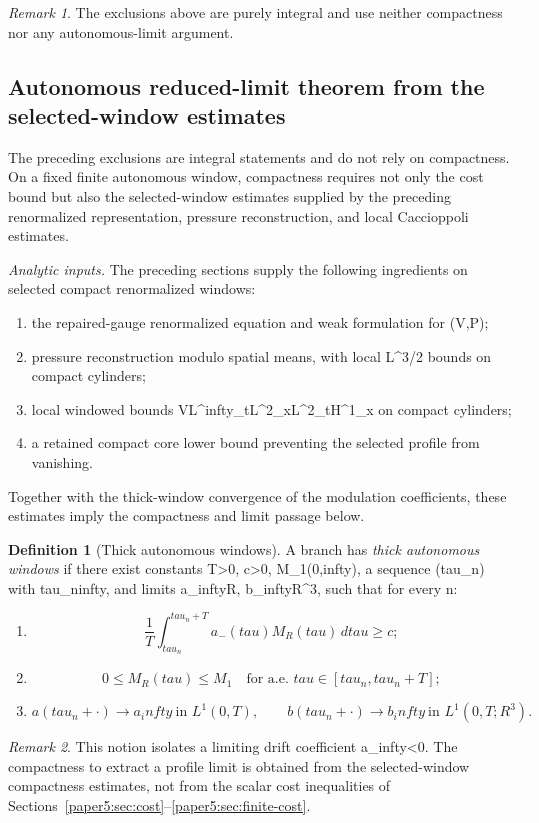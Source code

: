 \documentclass[11pt]{amsart}
\def\({}%
\def\){}%
\def\mathbb#1{#1}%
\def\tau{tau}%
\def\infty{infty}%
\theoremstyle{plain}
\theoremstyle{definition}
\newtheorem{definition}[definition]{Definition}
\theoremstyle{remark}
\newtheorem{remark}[remark]{Remark}
\begin{document}
\begin{remark}
The exclusions above are purely integral and use neither compactness nor any
autonomous-limit argument.
\end{remark}

\subsection{Autonomous reduced-limit theorem from the selected-window estimates}
\label{paper5:sec:autonomous}

The preceding exclusions are integral statements and do not rely on compactness.  On a fixed finite autonomous window, compactness requires not only the cost bound but also the selected-window estimates supplied by the preceding renormalized representation, pressure reconstruction, and local Caccioppoli estimates.

\medskip
\noindent\textit{Analytic inputs.}
The preceding sections supply the following ingredients on selected compact
renormalized windows:
\begin{enumerate}[label=(\arabic*)]
  \item the repaired-gauge renormalized equation and weak formulation for \((V,P)\);
  \item pressure reconstruction modulo spatial means, with local \(L^{3/2}\) bounds on compact
    cylinders;
  \item local windowed bounds
  \(V\in L^\infty_tL^2_x\cap L^2_tH^1_x\) on compact cylinders;
  \item a retained compact core lower bound preventing the selected profile from vanishing.
\end{enumerate}
Together with the thick-window convergence of the modulation coefficients, these estimates imply
the compactness and limit passage below.

\begin{definition}[Thick autonomous windows]\label{paper5:def:thick-autonomous-windows}
A branch has \emph{thick autonomous windows} if there exist constants
\(T>0\), \(c>0\), \(M_1\in(0,\infty)\), a sequence \((\tau_n)\) with
\(\tau_n\to\infty\), and limits \(a_\infty\in\mathbb R\),
\(b_\infty\in\mathbb R^3\), such that for every \(n\):
\begin{enumerate}[label=(\roman*)]
  \item
  \[
    \frac1T\int_{\tau_n}^{\tau_n+T}a_-(\tau)M_R(\tau)
    \,d\tau\ge c;
  \]
  \item
  \[
    0\le M_R(\tau)\le M_1\quad\text{for a.e. }\tau\in[\tau_n,\tau_n+T];
  \]
  \item
  \[
    a(\tau_n+\cdot)\to a_\infty\ \text{in }L^1(0,T),
    \qquad
    b(\tau_n+\cdot)\to b_\infty\ \text{in }L^1(0,T;\mathbb R^3).
  \]
\end{enumerate}
\end{definition}
\begin{remark}
This notion isolates a limiting drift coefficient \(a_\infty<0\).  The
compactness to extract a profile limit is obtained from the selected-window compactness estimates,
not from the scalar cost inequalities of Sections~\ref{paper5:sec:cost}--\ref{paper5:sec:finite-cost}.
\end{remark}
\end{document}
